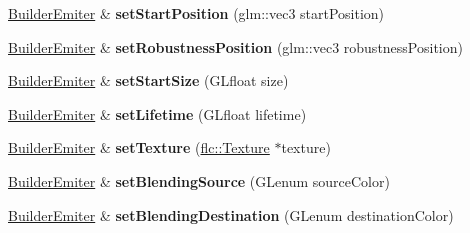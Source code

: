 \begin{DoxyCompactItemize}
\item 
\hyperlink{classflw_1_1flf_1_1BuilderEmiter}{Builder\+Emiter} \& {\bfseries set\+Start\+Position} (glm\+::vec3 start\+Position)\hypertarget{classflw_1_1flf_1_1BuilderEmiter_a67415b33f24dd3546738decdf397a156}{}\label{classflw_1_1flf_1_1BuilderEmiter_a67415b33f24dd3546738decdf397a156}

\item 
\hyperlink{classflw_1_1flf_1_1BuilderEmiter}{Builder\+Emiter} \& {\bfseries set\+Robustness\+Position} (glm\+::vec3 robustness\+Position)\hypertarget{classflw_1_1flf_1_1BuilderEmiter_a175528b261603f4c068742a466c683d6}{}\label{classflw_1_1flf_1_1BuilderEmiter_a175528b261603f4c068742a466c683d6}

\item 
\hyperlink{classflw_1_1flf_1_1BuilderEmiter}{Builder\+Emiter} \& {\bfseries set\+Start\+Size} (G\+Lfloat size)\hypertarget{classflw_1_1flf_1_1BuilderEmiter_aa15293c9c54677d2d8681b0554054c5f}{}\label{classflw_1_1flf_1_1BuilderEmiter_aa15293c9c54677d2d8681b0554054c5f}

\item 
\hyperlink{classflw_1_1flf_1_1BuilderEmiter}{Builder\+Emiter} \& {\bfseries set\+Lifetime} (G\+Lfloat lifetime)\hypertarget{classflw_1_1flf_1_1BuilderEmiter_ab6a83e1908dff2d44383a623150e05fd}{}\label{classflw_1_1flf_1_1BuilderEmiter_ab6a83e1908dff2d44383a623150e05fd}

\item 
\hyperlink{classflw_1_1flf_1_1BuilderEmiter}{Builder\+Emiter} \& {\bfseries set\+Texture} (\hyperlink{classflw_1_1flc_1_1Texture}{flc\+::\+Texture} $\ast$texture)\hypertarget{classflw_1_1flf_1_1BuilderEmiter_a475b844ff412679844ad119fa2089fbf}{}\label{classflw_1_1flf_1_1BuilderEmiter_a475b844ff412679844ad119fa2089fbf}

\item 
\hyperlink{classflw_1_1flf_1_1BuilderEmiter}{Builder\+Emiter} \& {\bfseries set\+Blending\+Source} (G\+Lenum source\+Color)\hypertarget{classflw_1_1flf_1_1BuilderEmiter_a27f8b3e2804ff47162fe2731cc167bf0}{}\label{classflw_1_1flf_1_1BuilderEmiter_a27f8b3e2804ff47162fe2731cc167bf0}

\item 
\hyperlink{classflw_1_1flf_1_1BuilderEmiter}{Builder\+Emiter} \& {\bfseries set\+Blending\+Destination} (G\+Lenum destination\+Color)\hypertarget{classflw_1_1flf_1_1BuilderEmiter_a14e4f56ea5d30c1495bf0affa80ed4d6}{}\label{classflw_1_1flf_1_1BuilderEmiter_a14e4f56ea5d30c1495bf0affa80ed4d6}


\end{DoxyCompactItemize}
